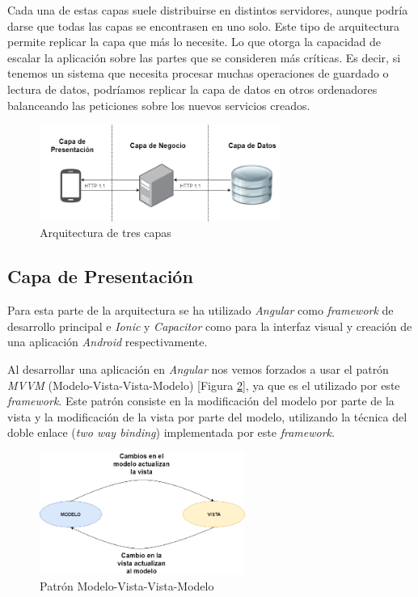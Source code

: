 Cada una de estas capas suele distribuirse en distintos servidores, aunque podría darse que todas las capas se encontrasen en uno solo. Este tipo de arquitectura permite replicar la capa que más lo necesite. Lo que otorga la capacidad de escalar la aplicación sobre las partes que se consideren más críticas. Es decir, si tenemos un sistema que necesita procesar muchas operaciones de guardado o lectura de datos, podríamos replicar la capa de datos en otros ordenadores balanceando las peticiones sobre los nuevos servicios creados.
\begin{figure}[H]
    \centering
    \includegraphics[width=0.7\textwidth, keepaspectratio]{imaxes/layer.png}
    \caption{Arquitectura de tres capas}
    \label{fig:arquitectura}
\end{figure}


\subsection{Capa de Presentación}
Para esta parte de la arquitectura se ha utilizado \textit{Angular} como \textit{framework} de desarrollo principal e \textit{Ionic} y \textit{Capacitor} como para la interfaz visual y creación de una aplicación \textit{Android} respectivamente.

Al desarrollar una aplicación en \textit{Angular} nos vemos forzados a usar el patrón \textit{MVVM} (Modelo-Vista-Vista-Modelo) [Figura \ref{fig:mvvm}], ya que es el utilizado por este \textit{framework}.
Este patrón consiste en la modificación del modelo por parte de la vista y la modificación de la vista por parte del modelo, utilizando la técnica del doble enlace (\textit{two way binding}) implementada por este \textit{framework}.


\begin{figure}[H]
    \centering
    \includegraphics[width=0.6\textwidth, keepaspectratio]{imaxes/MVVM.png}
    \caption{Patrón Modelo-Vista-Vista-Modelo}
    \label{fig:mvvm}
\end{figure}


